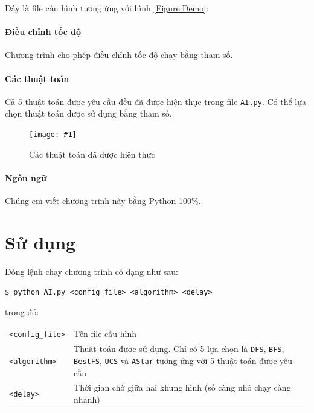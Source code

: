 \documentclass[a4paper]{article}
\newcommand{\Image}[3]{
	\begin{figure}[H]
		\begin{center}
			\texttt{[image: \#1]}
			\caption{#3}
		\end{center}
	\end{figure}
}
\begin{document}
	Đây là file cấu hình tương ứng với hình \ref{Figure:Demo}:\\
	

	\paragraph{Điều chỉnh tốc độ}\par
	Chương trình cho phép điều chỉnh tốc độ chạy bằng tham số.

	\paragraph{Các thuật toán}\par
	Cả 5 thuật toán được yêu cầu đều đã được hiện thực trong file \texttt{AI.py}. Có thể lựa chọn thuật toán được sử dụng bằng tham số.
	\Image{Image/Algo.png}{0.8}{Các thuật toán đã được hiện thực}

	\paragraph{Ngôn ngữ}\par
	Chúng em viết chương trình này bằng Python 100\%.



	\section{Sử dụng}
	Dòng lệnh chạy chương trình có dạng như sau:\\
	\begin{center}
	\texttt{\$ python AI.py <config\_file> <algorithm> <delay>}
	\end{center}

	trong đó:
	\begin{center}
		\begin{tabular}{p{3cm}p{9cm}}
			\texttt{<config\_file>} & Tên file cấu hình\\
			\texttt{<algorithm>} & Thuật toán được sử dụng. Chỉ có 5 lựa chọn là \texttt{DFS}, \texttt{BFS}, \texttt{BestFS}, \texttt{UCS} và \texttt{AStar} tương ứng với 5 thuật toán được yêu cầu\\
			\texttt{<delay>} & Thời gian chờ giữa hai khung hình (số càng nhỏ chạy càng nhanh)\\
		\end{tabular}
	\end{center}
\end{document}
